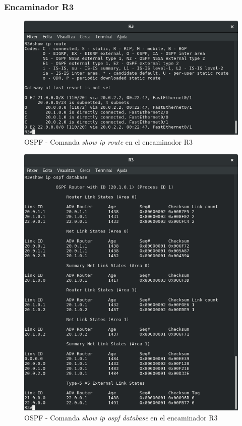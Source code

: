 \documentclass[10pt]{article}
\begin{document}
\subsubsection{Encaminador R3}
\begin{figure}[H]
\begin{center}
\includegraphics[scale=0.5]{Images/ospf-R3-route.png}
\caption{OSPF - Comanda \textit{show ip route} en el encaminador R3}
\end{center}
\end{figure}
\begin{figure}[H]
\begin{center}
\includegraphics[scale=0.4]{Images/ospf-R3-database.png}
\caption{OSPF - Comanda \textit{show ip ospf database} en el encaminador R3}
\end{center}
\end{figure}
\end{document}
